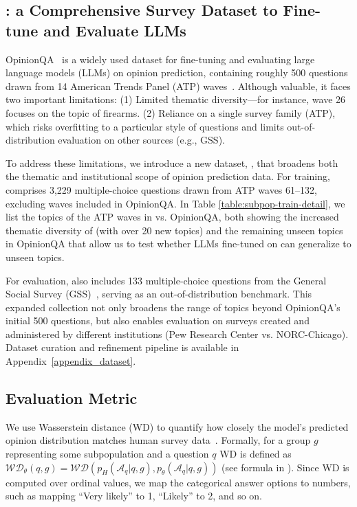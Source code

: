 \subsection{\OURDATA: a Comprehensive Survey Dataset to Fine-tune and Evaluate LLMs}
\label{section_method_datasets}
OpinionQA~\cite{santurkar2023whose} is a widely used dataset for fine-tuning and evaluating large language models (LLMs) on opinion prediction, containing roughly 500 questions drawn from 14 American Trends Panel (ATP) waves~\cite{atp}. 
Although valuable, it faces two important limitations:
(1) Limited thematic diversity—for instance, wave 26 focuses on the topic of firearms.
(2) Reliance on a single survey family (ATP), which risks overfitting to a particular style of questions and limits out-of-distribution evaluation on other sources (e.g., GSS).

To address these limitations, we introduce a new dataset, \OURDATA, that broadens both the thematic and institutional scope of opinion prediction data. 
For training, \OURDATA comprises 3,229 multiple-choice questions drawn from ATP waves 61--132, excluding 
waves included in OpinionQA.
In Table \ref{table:subpop-train-detail}, we list the topics of the ATP waves in \OURDATA vs. OpinionQA, both showing the increased thematic diversity of \OURDATA (with over 20 new topics) and the remaining unseen topics in OpinionQA that allow us to test whether LLMs fine-tuned on \OURDATA can generalize to unseen topics.

For evaluation, \OURDATA also includes 133 multiple-choice questions from the General Social Survey (GSS)~\cite{davern2024gss}, serving as an out-of-distribution benchmark.
This expanded collection not only broadens the range of topics beyond OpinionQA’s initial 500 questions, but also enables evaluation on surveys created and administered by different institutions (Pew Research Center vs. NORC-Chicago). 
Dataset curation and refinement pipeline is available in Appendix~\ref{appendix_dataset}.

\subsection{Evaluation Metric}
\label{section_method_evaluation_metric}
We use Wasserstein distance (WD) to quantify how closely the model’s predicted opinion distribution matches human survey data~\cite{santurkar2023whose, moon-etal-2024-virtual, meister2024benchmarking, zhao2023group}.
Formally, for a group $g$ representing some subpopulation and a question $q$
WD is defined as $\mathcal{WD}_{\theta}(q,g) = \mathcal{WD}(p_H(\mathcal{A}_q|q,g) , p_{\theta}(\mathcal{A}_q|q,g))$ (see formula in ).
Since WD is computed over ordinal values, we map the categorical answer options to numbers, such as mapping ``Very likely'' to 1, ``Likely'' to 2, and so on. 

